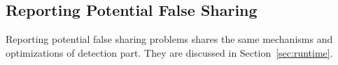 \subsection{Reporting Potential False Sharing}
Reporting potential false sharing problems shares the same mechanisms and optimizations 
of detection part.
They are discussed in Section~\ref{sec:runtime}.

